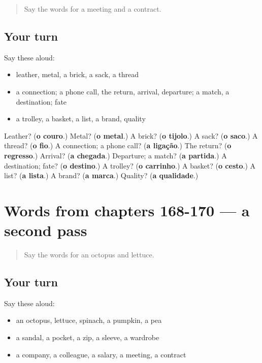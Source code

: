 \label{lesson:PT-R170-first-pass-words-from-chapters-165-167}



\begin{quote}
Say the words for a meeting and a contract.
\end{quote}

\subsection*{Your turn}
Say these aloud:

\begin{itemize}
\raggedright
  \item leather, metal, a brick, a sack, a thread
  \item a connection; a phone call, the return, arrival, departure; a match, a destination; fate
  \item a trolley, a basket, a list, a brand, quality
\end{itemize}

\begin{tcolorbox}[breakable,colback=teal!4,colframe=teal!35!black,title={Before you move on}]
Leather? (\textbf{o couro}.) Metal? (\textbf{o metal}.) A brick? (\textbf{o tijolo}.) A sack? (\textbf{o saco}.) A thread? (\textbf{o fio}.) A connection; a phone call? (\textbf{a ligação}.) The return? (\textbf{o regresso}.) Arrival? (\textbf{a chegada}.) Departure; a match? (\textbf{a partida}.) A destination; fate? (\textbf{o destino}.) A trolley? (\textbf{o carrinho}.) A basket? (\textbf{o cesto}.) A list? (\textbf{a lista}.) A brand? (\textbf{a marca}.) Quality? (\textbf{a qualidade}.)
\end{tcolorbox}
\section[(dialogue)]{Words from chapters 168-170 — a second pass}

\label{lesson:PT-R170-second-pass-words-from-chapters-168-170}



\begin{quote}
Say the words for an octopus and lettuce.
\end{quote}

\subsection*{Your turn}
Say these aloud:

\begin{itemize}
\raggedright
  \item an octopus, lettuce, spinach, a pumpkin, a pea
  \item a sandal, a pocket, a zip, a sleeve, a wardrobe
  \item a company, a colleague, a salary, a meeting, a contract
\end{itemize}

